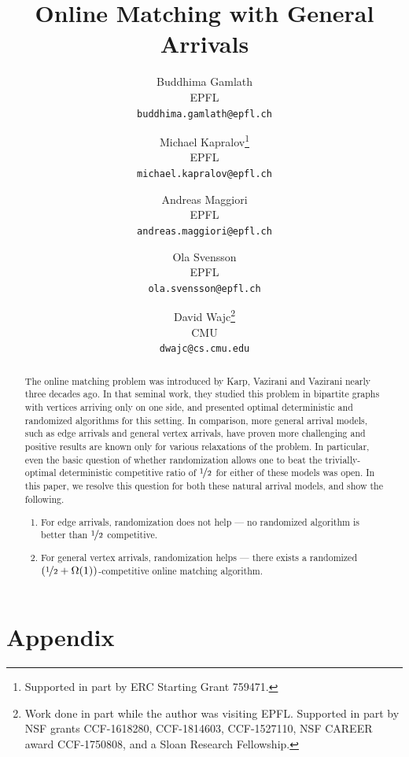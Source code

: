 \documentclass[11pt]{article}
\begin{document}
\title{Online Matching with General Arrivals}
 \author{
   Buddhima Gamlath \\
   EPFL\\
  \texttt{buddhima.gamlath@epfl.ch}
     \and
   Michael Kapralov\footnote{Supported in part by ERC Starting Grant 759471.} \\
  EPFL\\
   \texttt{michael.kapralov@epfl.ch}
     \and
   Andreas Maggiori\\
  EPFL\\
   \texttt{andreas.maggiori@epfl.ch}
     \and
   Ola Svensson\\
  EPFL\\
   \texttt{ola.svensson@epfl.ch}
   \and 
   David Wajc\footnote{Work done in part while the author was visiting EPFL. Supported in part by NSF grants CCF-1618280, CCF-1814603, CCF-1527110, NSF CAREER award CCF-1750808, and a Sloan Research Fellowship.} \\
   CMU \\
   \texttt{dwajc@cs.cmu.edu}
 }
\date{}

\maketitle

\begin{abstract}
  The online matching problem was introduced by Karp, Vazirani and Vazirani nearly three decades ago. In that seminal work, they studied this problem in bipartite graphs with vertices arriving only on one side, and presented optimal deterministic and randomized algorithms for this setting.
  In comparison, more general arrival models, such as edge arrivals and general vertex arrivals,  have proven more challenging and positive results are known only for various relaxations of the problem. In particular, even the basic question of whether randomization allows one to beat the trivially-optimal deterministic competitive ratio of $\nicefrac{1}{2}$ for either of these models was open. In this paper, we resolve this question for both these natural arrival models, and show the following. 
  \begin{enumerate}
      \item For edge arrivals, randomization does not help --- no randomized algorithm is better than $\nicefrac{1}{2}$ competitive.
      \item For general vertex arrivals, randomization helps --- there exists a randomized $(\nicefrac{1}{2}+\Omega(1))$-competitive online matching algorithm.
  \end{enumerate}
\end{abstract}

\newpage
{}





\appendix
\section*{Appendix}




\end{document}
